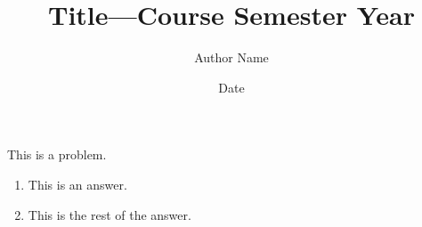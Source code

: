 \documentclass{article}
\title{Title---Course Semester Year}
\author{Author Name}
\date{Date}
\begin{document}
\maketitle


\begin{problem}
This is a problem.
\end{problem}

\begin{enumerate}[label=(\alph{*})]
\item This is an answer.
\item This is the rest of the answer.
\end{enumerate}
\end{document}
